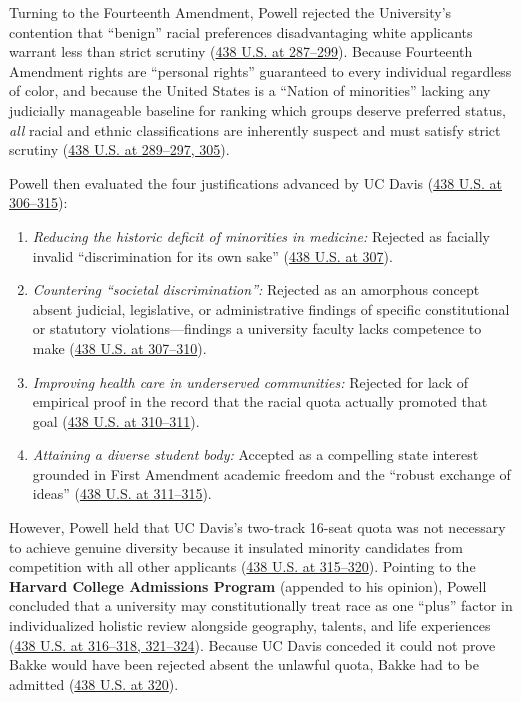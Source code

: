 \documentclass[12pt]{article}
\begin{document}
Turning to the Fourteenth Amendment, Powell rejected the University's contention that ``benign'' racial preferences disadvantaging white applicants warrant less than strict scrutiny (\href{https://supreme.justia.com/cases/federal/us/438/265/}{438 U.S. at 287--299}). Because Fourteenth Amendment rights are ``personal rights'' guaranteed to every individual regardless of color, and because the United States is a ``Nation of minorities'' lacking any judicially manageable baseline for ranking which groups deserve preferred status, \textit{all} racial and ethnic classifications are inherently suspect and must satisfy strict scrutiny (\href{https://supreme.justia.com/cases/federal/us/438/265/}{438 U.S. at 289--297, 305}).

Powell then evaluated the four justifications advanced by UC Davis (\href{https://supreme.justia.com/cases/federal/us/438/265/}{438 U.S. at 306--315}):
\begin{enumerate}
\item \textit{Reducing the historic deficit of minorities in medicine:} Rejected as facially invalid ``discrimination for its own sake'' (\href{https://supreme.justia.com/cases/federal/us/438/265/}{438 U.S. at 307}).
\item \textit{Countering ``societal discrimination'':} Rejected as an amorphous concept absent judicial, legislative, or administrative findings of specific constitutional or statutory violations---findings a university faculty lacks competence to make (\href{https://supreme.justia.com/cases/federal/us/438/265/}{438 U.S. at 307--310}).
\item \textit{Improving health care in underserved communities:} Rejected for lack of empirical proof in the record that the racial quota actually promoted that goal (\href{https://supreme.justia.com/cases/federal/us/438/265/}{438 U.S. at 310--311}).
\item \textit{Attaining a diverse student body:} Accepted as a compelling state interest grounded in First Amendment academic freedom and the ``robust exchange of ideas'' (\href{https://supreme.justia.com/cases/federal/us/438/265/}{438 U.S. at 311--315}).
\end{enumerate}
However, Powell held that UC Davis's two-track 16-seat quota was not necessary to achieve genuine diversity because it insulated minority candidates from competition with all other applicants (\href{https://supreme.justia.com/cases/federal/us/438/265/}{438 U.S. at 315--320}). Pointing to the \textbf{Harvard College Admissions Program} (appended to his opinion), Powell concluded that a university may constitutionally treat race as one ``plus'' factor in individualized holistic review alongside geography, talents, and life experiences (\href{https://supreme.justia.com/cases/federal/us/438/265/}{438 U.S. at 316--318, 321--324}). Because UC Davis conceded it could not prove Bakke would have been rejected absent the unlawful quota, Bakke had to be admitted (\href{https://supreme.justia.com/cases/federal/us/438/265/}{438 U.S. at 320}).
\end{document}
